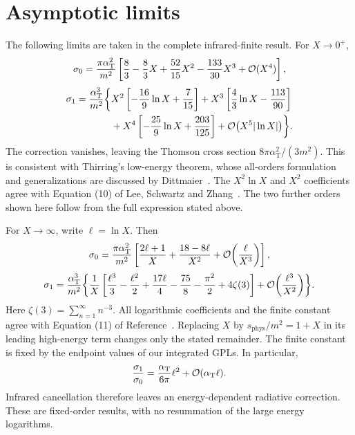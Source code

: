 \section{Asymptotic limits}
The following limits are taken in the complete infrared-finite result.
For $X\to0^+$,
\begin{equation}
 \sigma_0=\frac{\pi\alpha_{\mathrm T}^2}{m^2}
 \left[\frac83-\frac83X+\frac{52}{15}X^2-\frac{133}{30}X^3
 +\mathcal{O}(X^4)\right],
\end{equation}
\begin{equation}
 \begin{aligned}
 \sigma_1=\frac{\alpha_{\mathrm T}^3}{m^2}\biggl\{&
 X^2\left[-\frac{16}{9}\ln X+\frac7{15}\right]
 +X^3\left[\frac43\ln X-\frac{113}{90}\right]\\
 &+X^4\left[-\frac{25}{9}\ln X+\frac{203}{125}\right]
 +\mathcal{O}\!\left(X^5|\ln X|\right)\biggr\}.
 \end{aligned}
 \label{eq:comp-overview-low}
\end{equation}
The correction vanishes, leaving the Thomson cross section
$8\pi\alpha_{\mathrm T}^2/(3m^2)$. This is consistent with Thirring's
low-energy theorem, whose all-orders formulation and generalizations
are discussed by Dittmaier~\cite{compton-overview-thirring}.
The $X^2\ln X$ and $X^2$ coefficients agree with Equation (10) of
Lee, Schwartz and Zhang~\cite{qed-processes-lsz}. The two further orders
shown here follow from the full expression stated above.

For $X\to\infty$, write $\ell=\ln X$. Then
\begin{equation}
 \sigma_0=\frac{\pi\alpha_{\mathrm T}^2}{m^2}
 \left[\frac{2\ell+1}{X}+\frac{18-8\ell}{X^2}
 +\mathcal{O}\!\left(\frac\ell{X^3}\right)\right],
\end{equation}
\begin{equation}
 \sigma_1=\frac{\alpha_{\mathrm T}^3}{m^2}\biggl\{
 \frac1X\left[\frac{\ell^3}{3}-\frac{\ell^2}{2}
 +\frac{17\ell}{4}-\frac{75}{8}-\frac{\pi^2}{2}+4\zeta(3)\right]
 +\mathcal{O}\!\left(\frac{\ell^3}{X^2}\right)\biggr\}.
 \label{eq:comp-overview-high}
\end{equation}
Here $\zeta(3)=\sum_{n=1}^{\infty}n^{-3}$.
All logarithmic coefficients and the finite constant agree with
Equation (11) of Reference~\cite{qed-processes-lsz}.
Replacing $X$ by $s_{\mathrm{phys}}/m^2=1+X$ in its leading high-energy
term changes only the stated remainder. The finite constant is fixed by the endpoint values of our integrated GPLs.
In particular,
\begin{equation}
 \frac{\sigma_1}{\sigma_0}
 =\frac{\alpha_{\mathrm T}}{6\pi}\ell^2
 +\mathcal{O}(\alpha_{\mathrm T}\ell).
\end{equation}
Infrared cancellation therefore leaves an energy-dependent radiative
correction. These are fixed-order results, with no resummation of the
large energy logarithms.
